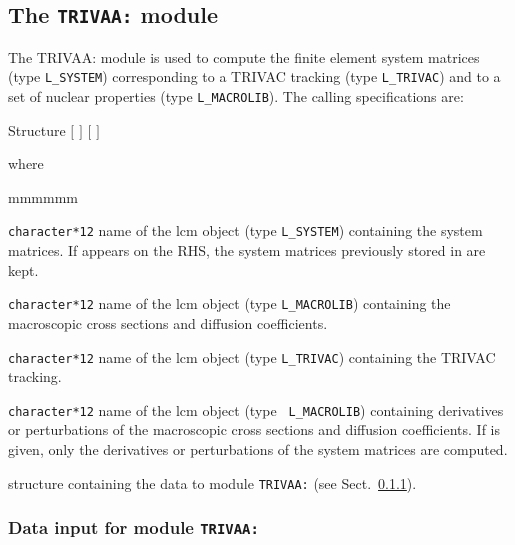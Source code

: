 \subsection{The {\tt TRIVAA:} module}

The TRIVAA: module is used to compute the finite element system matrices (type {\tt L\_SYSTEM}) corresponding to a TRIVAC {\sc tracking} (type {\tt L\_TRIVAC}) and to a set of nuclear properties (type {\tt L\_MACROLIB}). The calling specifications are:

\begin{DataStructure}{Structure }
 \moc{:=}  $[$  $]$    $[$  $]$ \moc{::} 
\end{DataStructure}

\noindent where
\begin{ListeDeDescription}{mmmmmm}

\item[\dusa{SYST}] {\tt character*12} name of the {\sc lcm} object (type {\tt L\_SYSTEM}) containing the system matrices. If  appears on the RHS, the system matrices previously stored in  are kept.

\item[\dusa{MACRO}] {\tt character*12} name of the {\sc lcm} object (type {\tt L\_MACROLIB}) containing the macroscopic cross sections and diffusion coefficients.

\item[\dusa{TRACK}] {\tt character*12} name of the {\sc lcm} object (type {\tt L\_TRIVAC}) containing the TRIVAC {\sc tracking}.

\item[\dusa{DMACRO}] {\tt character*12} name of the {\sc lcm} object  (type {\tt
L\_MACROLIB}) containing derivatives or perturbations of the macroscopic cross
sections and diffusion coefficients. If  is given, only
the derivatives or perturbations of the system matrices are computed.

\item[\dstr{trivaa\_data}] structure containing the data to module {\tt TRIVAA:} (see Sect.~\ref{sect:trivaa_data}).

\end{ListeDeDescription}

\vskip 0.2cm

\subsubsection{Data input for module {\tt TRIVAA:}}\label{sect:trivaa_data}

